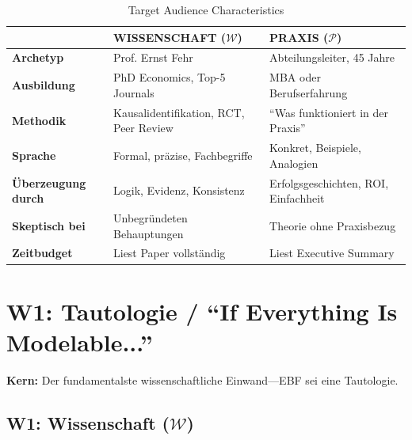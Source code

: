 \begin{table}[htbp]
\centering
\caption{Target Audience Characteristics}
\renewcommand{\arraystretch}{1.4}
\begin{tabular}{@{}lp{6cm}p{6cm}@{}}
\toprule
& \textbf{WISSENSCHAFT ($\mathcal{W}$)} & \textbf{PRAXIS ($\mathcal{P}$)} \\
\midrule
\textbf{Archetyp} & Prof. Ernst Fehr & Abteilungsleiter, 45 Jahre \\
\textbf{Ausbildung} & PhD Economics, Top-5 Journals & MBA oder Berufserfahrung \\
\textbf{Methodik} & Kausalidentifikation, RCT, Peer Review & ``Was funktioniert in der Praxis'' \\
\textbf{Sprache} & Formal, präzise, Fachbegriffe & Konkret, Beispiele, Analogien \\
\textbf{Überzeugung durch} & Logik, Evidenz, Konsistenz & Erfolgsgeschichten, ROI, Einfachheit \\
\textbf{Skeptisch bei} & Unbegründeten Behauptungen & Theorie ohne Praxisbezug \\
\textbf{Zeitbudget} & Liest Paper vollständig & Liest Executive Summary \\
\bottomrule
\end{tabular}
\end{table}

\section{W1: Tautologie / ``If Everything Is Modelable...''}
\label{sec:da2-w1}

\begin{tcolorbox}[colback=red!5!white, colframe=red!75!black,
    title=W1: ``Wenn alles modellierbar ist, ist nichts falsifizierbar'']
\textbf{Kern:} Der fundamentalste wissenschaftliche Einwand---EBF sei eine Tautologie.
\end{tcolorbox}

\subsection{W1: Wissenschaft ($\mathcal{W}$)}


